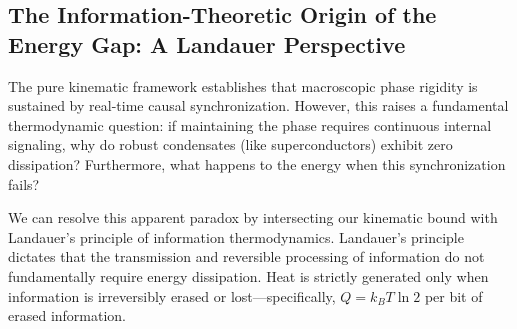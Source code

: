 \documentclass[11pt,a4paper]{article}
\begin{document}


\subsection*{The Information-Theoretic Origin of the Energy Gap: A Landauer Perspective}

The pure kinematic framework establishes that macroscopic phase rigidity is sustained by real-time causal synchronization. However, this raises a fundamental thermodynamic question: if maintaining the phase requires continuous internal signaling, why do robust condensates (like superconductors) exhibit zero dissipation? Furthermore, what happens to the energy when this synchronization fails?

We can resolve this apparent paradox by intersecting our kinematic bound with Landauer's principle of information thermodynamics. Landauer's principle dictates that the transmission and reversible processing of information do not fundamentally require energy dissipation. Heat is strictly generated only when information is irreversibly erased or lost---specifically, $Q = k_B T \ln 2$ per bit of erased information.
\end{document}
